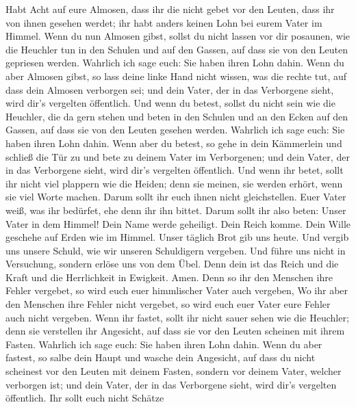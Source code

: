  Habt Acht auf eure Almosen, dass ihr die nicht gebet vor
den Leuten, dass ihr von ihnen gesehen werdet; ihr habt anders keinen
Lohn bei eurem Vater im Himmel.  Wenn du nun Almosen
gibst, sollst du nicht lassen vor dir posaunen, wie die Heuchler tun in
den Schulen und auf den Gassen, auf dass sie von den Leuten gepriesen
werden. Wahrlich ich sage euch: Sie haben ihren Lohn dahin.
 Wenn du aber Almosen gibst, so lass deine linke Hand
nicht wissen, was die rechte tut,  auf dass dein Almosen
verborgen sei; und dein Vater, der in das Verborgene sieht, wird dir's
vergelten öffentlich.  Und wenn du betest, sollst du nicht
sein wie die Heuchler, die da gern stehen und beten in den Schulen und
an den Ecken auf den Gassen, auf dass sie von den Leuten gesehen werden.
Wahrlich ich sage euch: Sie haben ihren Lohn dahin.  Wenn
aber du betest, so gehe in dein Kämmerlein und schließ die Tür zu und
bete zu deinem Vater im Verborgenen; und dein Vater, der in das
Verborgene sieht, wird dir's vergelten öffentlich.  Und
wenn ihr betet, sollt ihr nicht viel plappern wie die Heiden; denn sie
meinen, sie werden erhört, wenn sie viel Worte machen. 
Darum sollt ihr euch ihnen nicht gleichstellen. Euer Vater weiß, was ihr
bedürfet, ehe denn ihr ihn bittet.  Darum sollt ihr also
beten: Unser Vater in dem Himmel! Dein Name werde geheiligt.
 Dein Reich komme. Dein Wille geschehe auf Erden wie im
Himmel.  Unser täglich Brot gib uns heute.
 Und vergib uns unsere Schuld, wie wir unseren
Schuldigern vergeben.  Und führe uns nicht in Versuchung,
sondern erlöse uns von dem Übel. Denn dein ist das Reich und die Kraft
und die Herrlichkeit in Ewigkeit. Amen.  Denn so ihr den
Menschen ihre Fehler vergebet, so wird euch euer himmlischer Vater auch
vergeben,  Wo ihr aber den Menschen ihre Fehler nicht
vergebet, so wird euch euer Vater eure Fehler auch nicht vergeben.
 Wenn ihr fastet, sollt ihr nicht sauer sehen wie die
Heuchler; denn sie verstellen ihr Angesicht, auf dass sie vor den Leuten
scheinen mit ihrem Fasten. Wahrlich ich sage euch: Sie haben ihren Lohn
dahin.  Wenn du aber fastest, so salbe dein Haupt und
wasche dein Angesicht,  auf dass du nicht scheinest vor
den Leuten mit deinem Fasten, sondern vor deinem Vater, welcher
verborgen ist; und dein Vater, der in das Verborgene sieht, wird dir's
vergelten öffentlich.  Ihr sollt euch nicht Schätze
